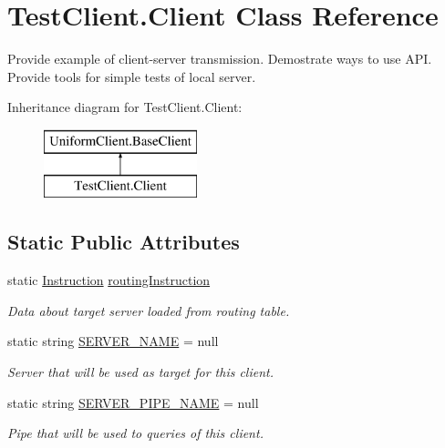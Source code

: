 \hypertarget{class_test_client_1_1_client}{}\section{Test\+Client.\+Client Class Reference}
\label{class_test_client_1_1_client}


Provide example of client-\/server transmission. Demostrate ways to use A\+PI. Provide tools for simple tests of local server.  


Inheritance diagram for Test\+Client.\+Client\+:\begin{figure}[H]
\begin{center}
\leavevmode
\includegraphics[height=2.000000cm]{d6/dac/class_test_client_1_1_client}
\end{center}
\end{figure}
\subsection*{Static Public Attributes}
\begin{DoxyCompactItemize}
\item 
static \mbox{\hyperlink{class_pipes_provider_1_1_networking_1_1_routing_1_1_instruction}{Instruction}} \mbox{\hyperlink{class_test_client_1_1_client_ac5365a862c09065db31123126239a7ee}{routing\+Instruction}}
\begin{DoxyCompactList}\small\item\em Data about target server loaded from routing table. \end{DoxyCompactList}\item 
static string \mbox{\hyperlink{class_test_client_1_1_client_a7fdac87931c97ce7fde6c4fc622bcfa6}{S\+E\+R\+V\+E\+R\+\_\+\+N\+A\+ME}} = null
\begin{DoxyCompactList}\small\item\em Server that will be used as target for this client. \end{DoxyCompactList}\item 
static string \mbox{\hyperlink{class_test_client_1_1_client_a58c70d565592caa15b99d9b145a133ea}{S\+E\+R\+V\+E\+R\+\_\+\+P\+I\+P\+E\+\_\+\+N\+A\+ME}} = null
\begin{DoxyCompactList}\small\item\em Pipe that will be used to queries of this client. \end{DoxyCompactList}\end{DoxyCompactItemize}
